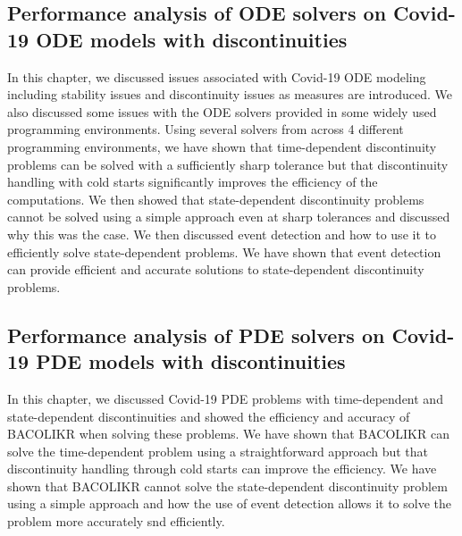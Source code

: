 \documentclass{report}
\begin{document}
\subsection{Performance analysis of ODE solvers on Covid-19 ODE models with discontinuities}
In this chapter, we discussed issues associated with Covid-19 ODE modeling including stability issues and discontinuity issues as measures are introduced. We also discussed some issues with the ODE solvers provided in some widely used programming environments. Using several solvers from across 4 different programming environments, we have shown that time-dependent discontinuity problems can be solved with a sufficiently sharp tolerance but that discontinuity handling with cold starts significantly improves the efficiency of the computations. We then showed that state-dependent discontinuity problems cannot be solved using a simple approach even at sharp tolerances and discussed why this was the case. We then discussed event detection and how to use it to efficiently solve state-dependent problems. We have shown that event detection can provide efficient and accurate solutions to state-dependent discontinuity problems.

\subsection{Performance analysis of PDE solvers on Covid-19 PDE models with discontinuities}
In this chapter, we discussed Covid-19 PDE problems with time-dependent and state-dependent discontinuities and showed the efficiency and accuracy of BACOLIKR when solving these problems. We have shown that BACOLIKR can solve the time-dependent problem using a straightforward approach but that discontinuity handling through cold starts can improve the efficiency. We have shown that BACOLIKR cannot solve the state-dependent discontinuity problem using a simple approach and how the use of event detection allows it to solve the problem more accurately snd efficiently.  
\end{document}
